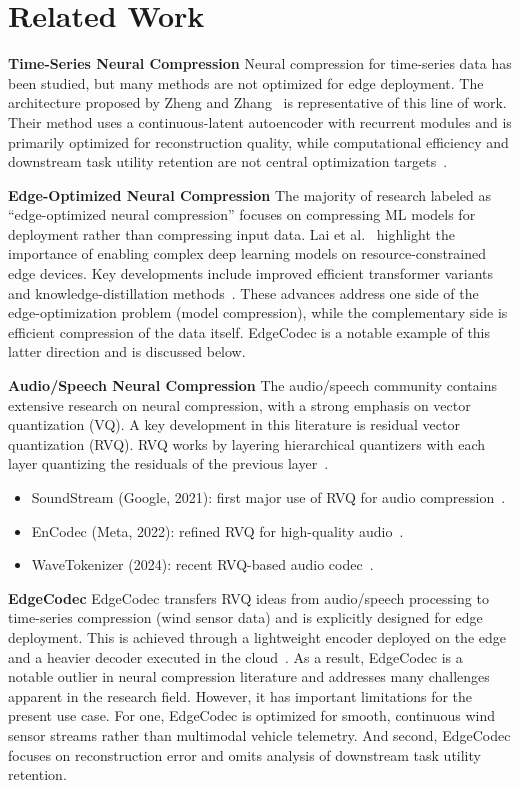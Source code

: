 \section{Related Work}

\textbf{Time-Series Neural Compression} Neural compression for time-series data has been studied, but many methods are not optimized for edge deployment. The architecture proposed by Zheng and Zhang~\cite{Zheng2023} is representative of this line of work. Their method uses a continuous-latent autoencoder with recurrent modules and is primarily optimized for reconstruction quality, while computational efficiency and downstream task utility retention are not central optimization targets~\cite{Zheng2023}.

\textbf{Edge-Optimized Neural Compression} The majority of research labeled as ``edge-optimized neural compression'' focuses on compressing ML models for deployment rather than compressing input data. Lai et al.~\cite{Lai2026} highlight the importance of enabling complex deep learning models on resource-constrained edge devices. Key developments include improved efficient transformer variants and knowledge-distillation methods~\cite{Lai2026}. These advances address one side of the edge-optimization problem (model compression), while the complementary side is efficient compression of the data itself. EdgeCodec is a notable example of this latter direction and is discussed below.

\textbf{Audio/Speech Neural Compression} The audio/speech community contains extensive research on neural compression, with a strong emphasis on vector quantization (VQ). A key development in this literature is residual vector quantization (RVQ). RVQ works by layering hierarchical quantizers with each layer quantizing the residuals of the previous layer~\cite[pp.~495--507]{Zeghidour2021}.

\begin{itemize}
    \item SoundStream (Google, 2021): first major use of RVQ for audio compression~\cite[pp.~495--507]{Zeghidour2021}.
    \item EnCodec (Meta, 2022): refined RVQ for high-quality audio~\cite{Defossez2022}.
    \item WaveTokenizer (2024): recent RVQ-based audio codec~\cite{Ji2025}.
\end{itemize}

\textbf{EdgeCodec} EdgeCodec transfers RVQ ideas from audio/speech processing to time-series compression (wind sensor data) and is explicitly designed for edge deployment. This is achieved through a lightweight encoder deployed on the edge and a heavier decoder executed in the cloud~\cite{Hodo2025}. As a result, EdgeCodec is a notable outlier in neural compression literature and addresses many challenges apparent in the research field. However, it has important limitations for the present use case. For one, EdgeCodec is optimized for smooth, continuous wind sensor streams rather than multimodal vehicle telemetry. And second, EdgeCodec focuses on reconstruction error and omits analysis of downstream task utility retention.

